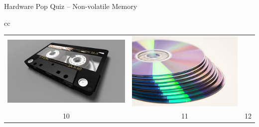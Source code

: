 \documentclass[compress,11pt,xcolor=svgnames,aspectratio=169]{beamer}
\begin{document}
\begin{frame}[t]{Hardware Pop Quiz -- Non-volatile Memory}
\begin{center}
\begin{tabular}{cc}
\begin{tabular}{ccc}
\includegraphics[scale=0.15]{fig/k7} &
\includegraphics[scale=0.15]{fig/cd} \\
10 & 11 & 12 \\
\end{tabular}

\end{tabular}

\end{center}

\end{frame}
\end{document}
